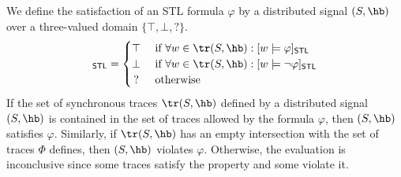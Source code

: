 We define the satisfaction of an STL formula $\varphi$ by a distributed signal $(S,{\hb})$ over a three-valued domain $\{\top, \bot, {?}\}$.
\small
\begin{equation*}
	[(S,{\hb}) \models \varphi]_{\mathsf{STL}} = 
	\begin{cases}
		\top & \text{ if } \forall w \in \tr(S,{\hb}) : [w \models \varphi]_{\mathsf{STL}} \\
		\bot & \text{ if } \forall w \in \tr(S,{\hb}) : [w \models \lnot\varphi]_{\mathsf{STL}} \\
		\,? & \text{ otherwise}
	\end{cases}
\end{equation*}
\normalsize
If the set of synchronous traces $\tr(S,{\hb})$ defined by a distributed signal $(S,{\hb})$ is contained in the set of traces allowed by the formula $\varphi$, then $(S,{\hb})$ satisfies $\varphi$.
Similarly, if $\tr(S,{\hb})$ has an empty intersection with the set of traces $\varPhi$ defines, then $(S,{\hb})$ violates $\varphi$.
Otherwise, the evaluation is inconclusive since some traces satisfy the property and some violate it.